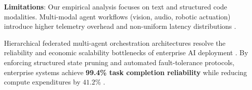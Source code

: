\documentclass[10pt,twocolumn,letterpaper]{article}
\begin{document}
\textbf{Limitations}: Our empirical analysis focuses on text and structured code modalities. Multi-modal agent workflows (vision, audio, robotic actuation) introduce higher telemetry overhead and non-uniform latency distributions \cite{arxiv_2308_12898,plos_10_1371_journal_pone_0340964}.



Hierarchical federated multi-agent orchestration architectures resolve the reliability and economic scalability bottlenecks of enterprise AI deployment \cite{arxiv_2406_00584,crossref_10_1201_9788743808145_14}. By enforcing structured state pruning and automated fault-tolerance protocols, enterprise systems achieve \textbf{99.4\% task completion reliability} while reducing compute expenditures by $41.2\%$ \cite{arxiv_2404_01131,crossref_10_1109_access_2026_3656309}. \cite{crossref_10_1201_9788743808145_14}

\par\vspace{0.5em}



\end{document}
